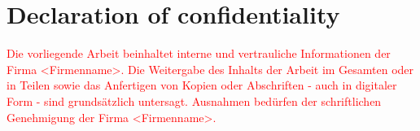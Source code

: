 \thispagestyle{empty}

\section*{Declaration of confidentiality}
\textcolor{red}{
Die vorliegende Arbeit beinhaltet interne und vertrauliche Informationen der Firma <Firmenname>.
Die Weitergabe des Inhalts der Arbeit im Gesamten oder in Teilen sowie das Anfertigen
von Kopien oder Abschriften - auch in digitaler Form - sind grundsätzlich untersagt.
Ausnahmen bedürfen der schriftlichen Genehmigung der Firma <Firmenname>.
}

